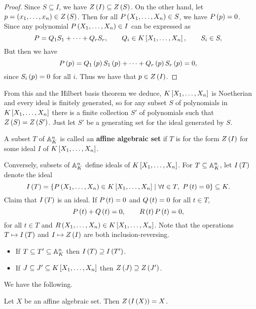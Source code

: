 \begin{proof}
Since $ S \subseteq I $, we have $ Z\rb{I} \subseteq Z\rb{S} $. On the other hand, let $ p = \rb{x_1, \dots, x_n} \in Z\rb{S} $. Then for all $ P\rb{X_1, \dots, X_n} \in S $, we have $ P\rb{p} = 0 $. Since any polynomial $ P\rb{X_1, \dots, X_n} \in I $ can be expressed as
$$ P = Q_1S_1 + \dots + Q_rS_r, \qquad Q_i \in K\sb{X_1, \dots, X_n}, \qquad S_i \in S, $$
But then we have
$$ P\rb{p} = Q_1\rb{p}S_1\rb{p} + \dots + Q_r\rb{p}S_r\rb{p} = 0, $$
since $ S_i\rb{p} = 0 $ for all $ i $. Thus we have that $ p \in Z\rb{I} $.
\end{proof}

From this and the Hilbert basis theorem we deduce, $ K\sb{X_1, \dots, X_n} $ is Noetherian and every ideal is finitely generated, so for any subset $ S $ of polynomials in $ K\sb{X_1, \dots, X_n} $ there is a finite collection $ S' $ of polynomials such that $ Z\rb{S} = Z\rb{S'} $. Just let $ S' $ be a generating set for the ideal generated by $ S $.

\begin{definition}
A subset $ T $ of $ \A_K^n $ is called an \textbf{affine algebraic set} if $ T $ is for the form $ Z\rb{I} $ for some ideal $ I $ of $ K\sb{X_1, \dots, X_n} $.
\end{definition}

Conversely, subsets of $ \A_K^n $ define ideals of $ K\sb{X_1, \dots, X_n} $. For $ T \subseteq \A_K^n $, let $ I\rb{T} $ denote the ideal
$$ I\rb{T} = \cb{P\rb{X_1, \dots, X_n} \in K\sb{X_1, \dots, X_n} \mid \forall t \in T, \ P\rb{t} = 0} \subseteq K. $$
Claim that $ I\rb{T} $ is an ideal. If $ P\rb{t} = 0 $ and $ Q\rb{t} = 0 $ for all $ t \in T $,
$$ P\rb{t} + Q\rb{t} = 0, \qquad R\rb{t}P\rb{t} = 0, $$
for all $ t \in T $ and $ R\rb{X_1, \dots, X_n} \in K\sb{X_1, \dots, X_n} $. Note that the operations $ T \mapsto I\rb{T} $ and $ I \mapsto Z\rb{I} $ are both inclusion-reversing.
\begin{itemize}
\item If $ T \subseteq T' \subseteq \A_K^n $ then $ I\rb{T} \supseteq I\rb{T'} $.
\item If $ J \subseteq J' \subseteq K\sb{X_1, \dots, X_n} $ then $ Z\rb{J} \supseteq Z\rb{J'} $.
\end{itemize}
We have the following.

\begin{lemma}
Let $ X $ be an affine algebraic set. Then $ Z\rb{I\rb{X}} = X $.
\end{lemma}

